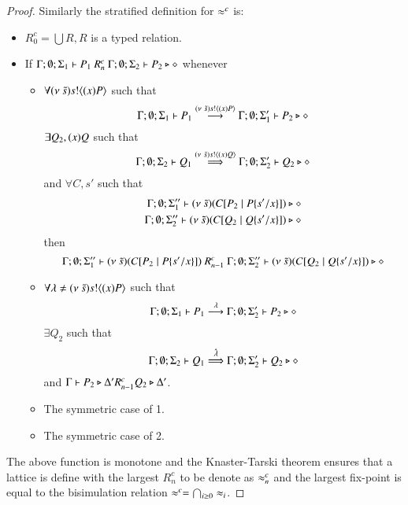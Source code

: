 \begin{proof}
	Similarly the stratified definition for $\approx^{c}$ is:

	\begin{itemize}
		\item	$R^c_0 = \bigcup R, R$ is a typed relation.
		\item	If $\Gamma; \emptyset; \Sigma_1 \vdash P_1\ R^c_n\ \Gamma; \emptyset; \Sigma_2 \vdash P_2 \triangleright \diamond$
			whenever
			\begin{itemize}
				\item	$\forall (\nu\ \tilde{s}) s ! \langle (x)P \rangle$ such that
					\[
						\Gamma; \emptyset; \Sigma_1 \vdash P_1 \stackrel{(\nu\ \tilde{s}) s ! \langle (x)P \rangle}{\longrightarrow} \Gamma; \emptyset; \Sigma_1' \vdash P_2 \triangleright \diamond
					\]
					$\exists Q_2, (x)Q$ such that
					\[
						\Gamma; \emptyset; \Sigma_2 \vdash Q_1 \stackrel{(\nu\ \tilde{s}) s ! \langle (x)Q \rangle}{\Longrightarrow} \Gamma; \emptyset; \Sigma_2' \vdash Q_2 \triangleright \diamond
					\]
					and $\forall C, s'$
					such that
					\begin{eqnarray*}
						\Gamma; \emptyset; \Sigma_1'' \vdash (\nu\ \tilde{s})(C[P_2 \;|\; P \{s'/x \}]) \triangleright \diamond \\
						\Gamma; \emptyset; \Sigma_2'' \vdash (\nu\ \tilde{s})(C[Q_2 \;|\; Q \{s'/x \}]) \triangleright \diamond
					\end{eqnarray*}
					then
					\[
						\Gamma; \emptyset; \Sigma_1'' \proves \newsp{\tilde{s}}{\context{C}{P_2 \Par P \subst{s'}{x}}}\ R^c_{n-1}\ 
						\Gamma; \emptyset; \Sigma_2'' \proves \newsp{\tilde{s}}{\context{C}{Q_2 \Par Q \subst{s'}{x}}} \hastype \Proc
					\]

				\item	$\forall \lambda \not= (\nu\ \tilde{s}) s ! \langle (x)P \rangle$ such that
					\[
						\Gamma; \emptyset; \Sigma_1 \vdash P_1 \stackrel{\lambda}{\longrightarrow} \Gamma; \emptyset; \Sigma_2'\vdash P_2 \triangleright \diamond
					\]
					$\exists Q_2$ such that 
					\[
						\Gamma; \emptyset; \Sigma_2 \vdash Q_1 \stackrel{\hat{\lambda}}{\Longrightarrow} \Gamma; \emptyset; \Sigma_2' \vdash Q_2 \triangleright \diamond
					\]
					and
					$\Gamma \vdash P_2 \triangleright \Delta' R^c_{n-1} Q_2 \triangleright \Delta'$.

				\item	The symmetric case of 1.
				\item	The symmetric case of 2.
			\end{itemize}
	\end{itemize}
	The above function is monotone and the Knaster-Tarski theorem ensures that a lattice is define
	with the largest $R^c_n$ to be denote as $\approx^{c}_n$ and the largest fix-point is equal to the bisimulation relation $\approx^{c} = \bigcap_{i \geq 0} \approx_i$.


\end{proof}
